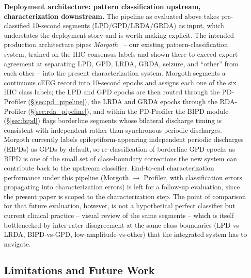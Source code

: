 \documentclass{iopjournal}
\begin{document}
\textbf{Deployment architecture: pattern classification upstream, characterization downstream.} The pipeline as evaluated above takes pre-classified 10-second segments (LPD/GPD/LRDA/GRDA) as input, which understates the deployment story and is worth making explicit. The intended production architecture pipes \emph{Morgoth}~\cite{jing2023} -- our existing pattern-classification system, trained on the IIIC consensus labels and shown there to exceed expert agreement at separating LPD, GPD, LRDA, GRDA, seizure, and ``other'' from each other -- into the present characterization system. Morgoth segments a continuous cEEG record into 10-second epochs and assigns each one of the six IIIC class labels; the LPD and GPD epochs are then routed through the PD-Profiler (\S\ref{sec:pd_pipeline}), the LRDA and GRDA epochs through the RDA-Profiler (\S\ref{sec:rda_pipeline}), and within the PD-Profiler the BIPD module (\S\ref{sec:bipd}) flags borderline segments whose bilateral discharge timing is consistent with independent rather than synchronous periodic discharges. Morgoth currently labels epileptiform-appearing independent periodic discharges (EIPDs) as GPDs by default, so re-classification of borderline GPD epochs as BIPD is one of the small set of class-boundary corrections the new system can contribute back to the upstream classifier. End-to-end characterization performance under this pipeline (Morgoth $\to$ Profiler, with classification errors propagating into characterization errors) is left for a follow-up evaluation, since the present paper is scoped to the characterization step. The point of comparison for that future evaluation, however, is not a hypothetical perfect classifier but current clinical practice -- visual review of the same segments -- which is itself bottlenecked by inter-rater disagreement at the same class boundaries (LPD-vs-LRDA, BIPD-vs-GPD, low-amplitude-vs-other) that the integrated system has to navigate.

\subsection{Limitations and Future Work}
\label{sec:limitations}
\end{document}
